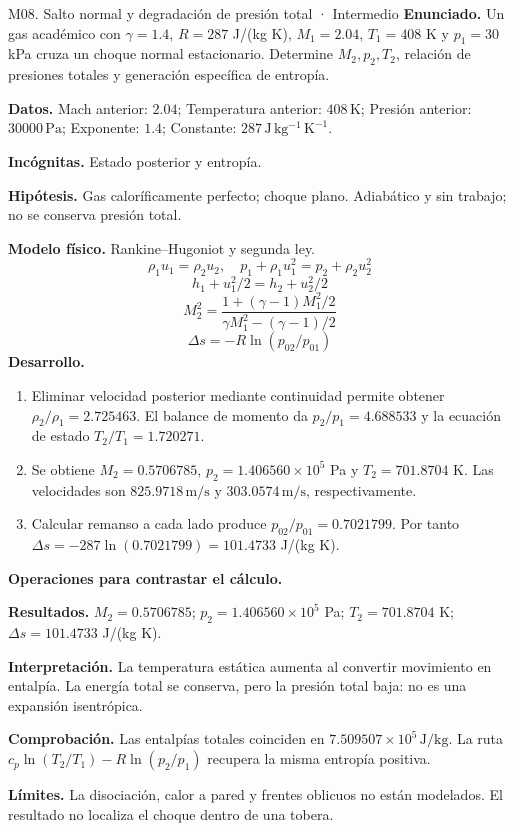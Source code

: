 \begin{studiumworked}{M08. Salto normal y degradación de presión total · Intermedio}
\textbf{Enunciado.} Un gas académico con $\gamma=1.4$, $R=287$ J/(kg K), $M_1=2.04$, $T_1=408$ K y $p_1=30$ kPa cruza un choque normal estacionario. Determine $M_2,p_2,T_2$, relación de presiones totales y generación específica de entropía.

\textbf{Datos.} Mach anterior: $2.04$; Temperatura anterior: $408\,\mathrm{K}$; Presión anterior: $30000\,\mathrm{Pa}$; Exponente: $1.4$; Constante: $287\,\mathrm{J\,kg^{-1}\,K^{-1}}$.

\textbf{Incógnitas.} Estado posterior y entropía.

\textbf{Hipótesis.} Gas caloríficamente perfecto; choque plano. Adiabático y sin trabajo; no se conserva presión total.

\textbf{Modelo físico.} Rankine--Hugoniot y segunda ley.
\[\rho_1u_1=\rho_2u_2,\quad p_1+\rho_1u_1^2=p_2+\rho_2u_2^2\]
\[h_1+u_1^2/2=h_2+u_2^2/2\]
\[M_2^2=\frac{1+(\gamma-1)M_1^2/2}{\gamma M_1^2-(\gamma-1)/2}\]
\[\Delta s=-R\ln(p_{02}/p_{01})\]
\textbf{Desarrollo.}
\begin{enumerate}
\item Eliminar velocidad posterior mediante continuidad permite obtener $\rho_2/\rho_1=2.725463$. El balance de momento da $p_2/p_1=4.688533$ y la ecuación de estado $T_2/T_1=1.720271$.
\item Se obtiene $M_2=0.5706785$, $p_2=1.406560\times10^{5}$ Pa y $T_2=701.8704$ K. Las velocidades son $825.9718\,\mathrm{m/s}$ y $303.0574\,\mathrm{m/s}$, respectivamente.
\item Calcular remanso a cada lado produce $p_{02}/p_{01}=0.7021799$. Por tanto $\Delta s=-287\ln(0.7021799)=101.4733$ J/(kg K).
\end{enumerate}
\textbf{Operaciones para contrastar el cálculo.}

\textbf{Resultados.} $M_2=0.5706785$; $p_2=1.406560\times10^{5}$ Pa; $T_2=701.8704$ K; $\Delta s=101.4733$ J/(kg K).

\textbf{Interpretación.} La temperatura estática aumenta al convertir movimiento en entalpía. La energía total se conserva, pero la presión total baja: no es una expansión isentrópica.

\textbf{Comprobación.} Las entalpías totales coinciden en $7.509507\times10^{5}\,\mathrm{J/kg}$. La ruta $c_p\ln(T_2/T_1)-R\ln(p_2/p_1)$ recupera la misma entropía positiva.

\textbf{Límites.} La disociación, calor a pared y frentes oblicuos no están modelados. El resultado no localiza el choque dentro de una tobera.
\end{studiumworked}
